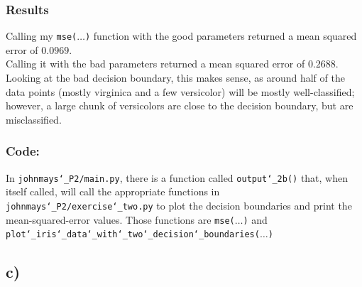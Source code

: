 \documentclass{article} %
\newcommand{\us}{\char`_}
\begin{document}
\subsubsection*{Results}
Calling my \texttt{mse($\hdots$)} function with the good parameters returned a mean squared error of $0.0969$.\\
Calling it with the bad parameters returned a mean squared error of $0.2688$.  Looking at the bad decision boundary, this makes sense, as around half of the data points (mostly virginica and a few versicolor) will be mostly well-classified; however, a large chunk of versicolors are close to the decision boundary, but are misclassified.
\subsubsection*{Code:}
In \texttt{johnmays\us P2/main.py}, there is a function called \texttt{output\us 2b()} that, when itself called, will call the appropriate functions in \texttt{johnmays\us P2/exercise\us two.py} to plot the decision boundaries and print the mean-squared-error values.  Those functions are \texttt{mse($\hdots$)} and \texttt{plot\us iris\us data\us with\us two\us decision\us boundaries($\hdots$)
}
\pagebreak
\subsection*{c)}
\end{document}
